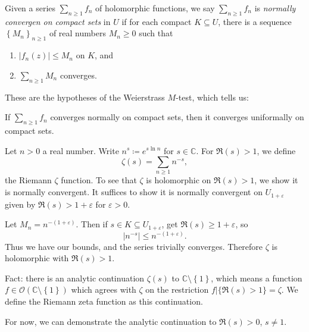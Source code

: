 \begin{definition}\label{dfn:ksaj}
	Given a series $\sum_{n\geq 1} f_n$ of holomorphic functions, we say $\sum_{n\geq 1} f_n$ is \emph{normally convergen on compact sets} in $U$ if for each compact $K\subseteq U$, there is a sequence $\left\{ M_n \right\}_{n\geq 1} $ of real numbers $M_{n} \geq 0$ such that
	\begin{enumerate}
		\item $\left| f_n(z) \right| \leq M_n$ on $K$, and
		\item $\sum_{n\geq 1} M_n$ converges.
	\end{enumerate}
	These are the hypotheses of the Weierstrass $M$-test, which tells us:
\end{definition}

\begin{theorem}\label{thmkjasn}
If $\sum_{n\geq 1} f_n$ converges normally on compact sets, then it converges uniformally on compact sets.
\end{theorem}


Let $n>0$ a real number. Write $n^s \coloneqq e^{s \ln n} $ for $s\in\mathbb{C} $. For $\Re (s) > 1$, we define
\[
	\zeta (s) = \sum_{n\geq 1} n^{-s} ,
\]
the Riemann $\zeta $ function. To see that $\zeta $ is holomorphic on $\Re (s) > 1$, we show it is normally convergent. It suffices to show it is normally convergent on $U_{1+\varepsilon } $ given by $\Re (s) > 1+\varepsilon $ for $\varepsilon >0$.

Let $M_n = n^{-(1+\varepsilon )} $. Then if $s\in K \subseteq U_{1+\varepsilon } $, get $\Re (s) \geq 1+\varepsilon $, so
\[
	\left| n^{-s} \right| \leq n^{-(1+\varepsilon )} 
.\]
Thus we have our bounds, and the series trivially converges. Therefore $\zeta $ is holomorphic with $\Re (s)>1$.

Fact: there is an analytic continuation $\zeta (s)$ to $\mathbb{C} \setminus \left\{ 1 \right\} $, which means a function $f\in \mathcal{O} (\mathbb{C} \setminus \left\{ 1 \right\} )$ which agrees with $\zeta $ on the restriction $f|\{\Re (s)>1\}=\zeta $. We define the Riemann zeta function as this continuation.

For now, we can demonstrate the analytic continuation to $\Re (s) > 0$, $s\neq 1$.

